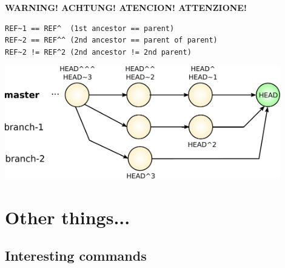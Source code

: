\begin{frame}[fragile]
  \frametitle{\insertsubsection}

\textbf{WARNING! ACHTUNG! ATENCION! ATTENZIONE!}
\begin{verbatim}
REF~1 == REF^  (1st ancestor == parent)
REF~2 == REF^^ (2nd ancestor == parent of parent)
REF~2 != REF^2 (2nd ancestor != 2nd parent)
\end{verbatim}

\begin{center}
  \includegraphics[width=0.9\textwidth]{images/pdf/git-references.pdf}
\end{center}

\end{frame}


\section{Other things...}

\subsection{Interesting commands}

